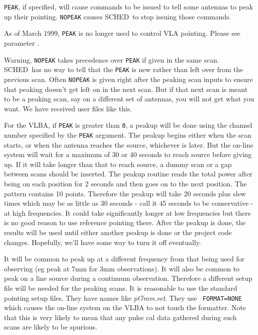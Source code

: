 \documentclass{report}
\newcommand{\schedb}{{\sc SCHED~}}
\begin{document}
{\tt PEAK}, if specified, will cause commands to be issued to tell
some antennas to peak up their pointing.  {\tt NOPEAK} causes
\schedb to stop issuing those commands.

As of March 1999, {\tt PEAK} is no longer used to control VLA
pointing.  Please see parameter .

Warning, {\tt NOPEAK} takes precedence over {\tt PEAK} if given in
the same scan.  \schedb has no way to tell that the {\tt PEAK} is new
rather than left over from the previous scan.  Often {\tt NOPEAK}
is given right after the peaking scan inputs to ensure that peaking
doesn't get left on in the next scan.  But if that next scan is 
meant to be a peaking scan, say on a different set of antennas, you
will not get what you want.  We have received user files like this.

For the VLBA, if {\tt PEAK} is greater than {\tt 0}, a peakup will be
done using the channel number specified by the {\tt PEAK} argument.
The peakup begins either when the scan starts, or when the antenna
reaches the source, whichever is later.  But the on-line system will
wait for a maximum of 30 or 40 seconds to reach source before giving
up. If it will take longer than that to reach source, a dummy scan or
a gap between scans should be inserted. The peakup routine reads the
total power after being on each position for 2 seconds and then goes
on to the next position. The pattern contains 10 points. Therefore the
peakup will take 20 seconds plus slew times which may be as little as
30 seconds - call it 45 seconds to be conservative - at high
frequencies. It could take significantly longer at low frequencies but
there is no good reason to use reference pointing there. After the
peakup is done, the results will be used until either another peakup
is done or the project code changes.  Hopefully, we'll have some way
to turn it off eventually.

It will be common to peak up at a different frequency from that being
used for observing (eg peak at 7mm for 3mm observations).  It will
also be common to peak on a line source during a continuum
observation.  Therefore a different setup file will be needed for the
peaking scans.  It is reasonable to use the standard pointing setup
files.  They have names like {\sl pt7mm.set}.  They use {\tt
FORMAT=NONE} which causes the on-line system on the VLBA to
not touch the formatter.  Note that this is very likely to mean
that any pulse cal data gathered during such scans are likely to
be spurious.
\end{document}
